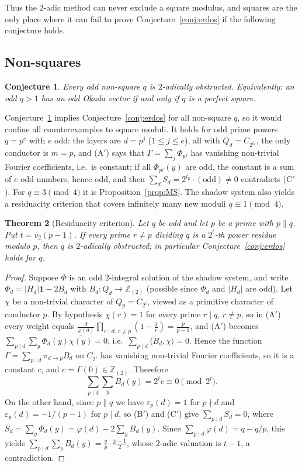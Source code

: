 \documentclass[11pt]{amsart}
\newtheorem{theorem}{Theorem}[section]
\newtheorem{conjecture}[theorem]{Conjecture}
\theoremstyle{definition}
\theoremstyle{remark}
\newcommand{\Zt}{\mathbb Z_{(2)}}
\newcommand{\ip}[2]{\langle #1,#2\rangle}
\numberwithin{equation}{section}
\begin{document}
Thus the $2$-adic method can never exclude a square modulus, and squares are the only place where it can fail to prove Conjecture~\ref{conj:erdos} if the following conjecture holds.

\subsection{Non-squares}
\begin{conjecture}\label{conj:nonsquare}
Every odd non-square $q$ is $2$-adically obstructed.
Equivalently: an odd $q>1$ has an odd Okada vector if and only if $q$ is a perfect square.
\end{conjecture}

Conjecture~\ref{conj:nonsquare} implies Conjecture~\ref{conj:erdos} for all non-square $q$, so it would confine all counterexamples to square moduli.
It holds for odd prime powers $q=p^{e}$ with $e$ odd: the layers are $d=p^j$ ($1\le j\le e$), all with $Q_d=C_{2^{t_p}}$, the only conductor is $m=p$, and (A$'$) says that $\Gamma=\sum_{j}\Phi_{p^j}$ has vanishing non-trivial Fourier coefficients, i.e.\ is constant; if all $\Phi_{p^j}(y)$ are odd, the constant is a sum of $e$ odd numbers, hence odd, and then $\sum_dS_d=2^{t_p}\cdot(\text{odd})\neq0$ contradicts (C$'$).
For $q\equiv3\pmod4$ it is Proposition~\ref{prop:MS}.
The shadow system also yields a residuacity criterion that covers infinitely many new moduli $q\equiv1\pmod 4$.

\begin{theorem}[Residuacity criterion]\label{thm:resid}
Let $q$ be odd and let $p$ be a prime with $p\parallel q$.
Put $t=v_2(p-1)$.
If every prime $r\neq p$ dividing $q$ is a $2^{t}$-th power residue modulo $p$, then $q$ is $2$-adically obstructed; in particular Conjecture~\ref{conj:erdos} holds for $q$.
\end{theorem}

\begin{proof}
Suppose $\Phi$ is an odd $2$-integral solution of the shadow system, and write $\Phi_d=|H_d|\mathbf 1-2B_d$ with $B_d\colon Q_d\to\Zt$ (possible since $\Phi_d$ and $|H_d|$ are odd).
Let $\chi$ be a non-trivial character of $Q_p=C_{2^t}$, viewed as a primitive character of conductor $p$.
By hypothesis $\chi(r)=1$ for every prime $r\mid q$, $r\ne p$, so in (A$'$) every weight equals $\frac{d}{\varphi(d)}\prod_{r\mid d,\,r\neq p}(1-\frac1r)=\frac p{p-1}$, and (A$'$) becomes $\sum_{p\mid d}\sum_y\Phi_d(y)\overline{\chi(y)}=0$, i.e.\ $\sum_{p\mid d}\ip{B_d}{\chi}=0$.
Hence the function $\Gamma=\sum_{p\mid d}\pi_{d\to p}B_d$ on $C_{2^t}$ has vanishing non-trivial Fourier coefficients, so it is a constant $c$, and $c=\Gamma(0)\in\Zt$.
Therefore
\[
\sum_{p\mid d}\sum_{y}B_d(y)=2^{t}c\equiv0\pmod{2^t}.
\]
On the other hand, since $p\parallel q$ we have $\varepsilon_p(d)=1$ for $p\nmid d$ and $\varepsilon_p(d)=-1/(p-1)$ for $p\mid d$, so (B$'$) and (C$'$) give $\sum_{p\mid d}S_d=0$, where $S_d=\sum_y\Phi_d(y)=\varphi(d)-2\sum_yB_d(y)$.
Since $\sum_{p\mid d}\varphi(d)=q-q/p$, this yields $\sum_{p\mid d}\sum_yB_d(y)=\frac qp\cdot\frac{p-1}2$, whose $2$-adic valuation is $t-1$, a contradiction.
\end{proof}
\end{document}
